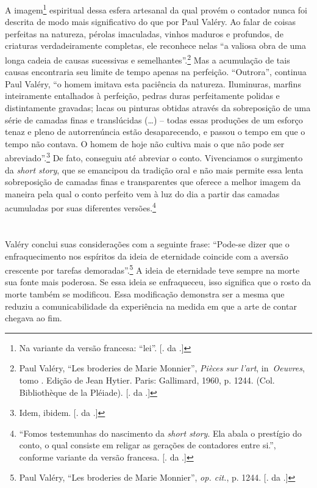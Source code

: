 A imagem\footnote{Na variante da versão francesa: ``lei''. [. da
  .]} espiritual dessa esfera artesanal da qual provém o contador
nunca foi descrita de modo mais significativo do que por Paul Valéry. Ao
falar de coisas perfeitas na natureza, pérolas imaculadas, vinhos
maduros e profundos, de criaturas verdadeiramente completas, ele
reconhece nelas ``a valiosa obra de uma longa cadeia de causas
sucessivas e semelhantes''.\footnote{Paul Valéry, ``Les broderies de
  Marie Monnier'', \emph{Pièces sur l'art}, in~\emph{Oeuvres}, tomo .
  Edição de Jean Hytier. Paris: Gallimard, 1960, p. 1244. (Col.
  Bibliothèque de la Pléiade). [. da .]} Mas a acumulação de tais
causas encontraria seu limite de tempo apenas na perfeição. ``Outrora'',
continua Paul Valéry, ``o homem imitava esta paciência da natureza.
Iluminuras, marfins inteiramente entalhados à perfeição, pedras duras
perfeitamente polidas e distintamente gravadas; lacas ou pinturas
obtidas através da sobreposição de uma série de camadas finas e
translúcidas (\ldots{}) -- todas essas produções de um esforço tenaz e pleno
de autorrenúncia estão desaparecendo, e passou o tempo em que o tempo
não contava. O homem de hoje não cultiva mais o que não pode ser
abreviado''.\footnote{Idem, ibidem. [. da .]} De fato, conseguiu
até abreviar o conto. Vivenciamos o surgimento da \emph{short story},
que se emancipou da tradição oral e não mais permite essa lenta
sobreposição de camadas finas e transparentes que oferece a melhor
imagem da maneira pela qual o conto perfeito vem à luz do dia a partir
das camadas acumuladas por suas diferentes versões\label{supra7}.\footnote{``Fomos
  testemunhas do nascimento da \emph{short story}. Ela abala o prestígio
  do conto, o qual consiste em religar as gerações de contadores entre
  si.'', conforme variante da versão francesa. [. da .]}

\section{}

Valéry conclui suas considerações com a seguinte frase: ``Pode-se dizer
que o enfraquecimento nos espíritos da ideia de eternidade coincide com
a aversão crescente por tarefas demoradas''.\footnote{Paul Valéry, ``Les
  broderies de Marie Monnier'', \emph{op. cit.}, p. 1244. [. da .]}
A ideia de eternidade teve sempre na morte sua fonte mais poderosa. Se
essa ideia se enfraqueceu, isso significa que o rosto da morte também se
modificou. Essa modificação demonstra ser a mesma que reduziu a
comunicabilidade da experiência na medida em que a arte de contar
chegava ao fim.

